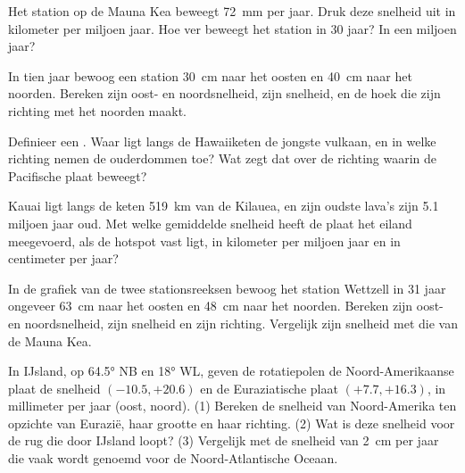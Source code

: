 \begin{exercise}[$\star$]\label{exo:g11:plate-motions:2}
Het station op de Mauna Kea beweegt \qty{72}{mm} per jaar. Druk deze snelheid uit in
kilometer per miljoen jaar. Hoe ver beweegt het station in 30 jaar? In
een miljoen jaar?
\end{exercise}

\begin{exercise}[$\star$]\label{exo:g11:plate-motions:3}
In tien jaar bewoog een station \qty{30}{cm} naar het oosten en \qty{40}{cm} naar
het noorden. Bereken zijn oost- en noordsnelheid, zijn snelheid, en de hoek die
zijn richting met het noorden maakt.
\end{exercise}

\begin{exercise}[$\star$]\label{exo:g11:plate-motions:4}
Definieer een . Waar ligt langs de Hawaiiketen de jongste
vulkaan, en in welke richting nemen de ouderdommen toe? Wat zegt dat
over de richting waarin de Pacifische plaat beweegt?
\end{exercise}

\begin{exercise}[$\star$]\label{exo:g11:plate-motions:5}
Kauai ligt langs de keten \qty{519}{km} van de Kilauea, en zijn oudste lava's
zijn \num{5.1} miljoen jaar oud. Met welke gemiddelde snelheid heeft de plaat het
eiland meegevoerd, als de hotspot vast ligt, in kilometer per miljoen jaar en
in centimeter per jaar?
\end{exercise}

\begin{exercise}[$\star\star$]\label{exo:g11:plate-motions:6}
In de grafiek van de twee stationsreeksen bewoog het station Wettzell in 31 jaar
ongeveer \qty{63}{cm} naar het oosten en \qty{48}{cm} naar het noorden. Bereken zijn
oost- en noordsnelheid, zijn snelheid en zijn richting. Vergelijk zijn snelheid
met die van de Mauna Kea.
\end{exercise}

\begin{exercise}[$\star\star$]\label{exo:g11:plate-motions:7}
In IJsland, op \ang{64.5} NB en \ang{18} WL, geven de rotatiepolen
de Noord-Amerikaanse plaat de snelheid $(-10.5, +20.6)$ en de Euraziatische
plaat $(+7.7, +16.3)$, in millimeter per jaar (oost, noord). (1) Bereken de
snelheid van Noord-Amerika ten opzichte van Eurazië, haar grootte en haar richting.
(2) Wat is deze snelheid voor de rug die door IJsland loopt? (3) Vergelijk met
de snelheid van \qty{2}{cm} per jaar die vaak wordt genoemd voor de Noord-Atlantische Oceaan.
\end{exercise}

